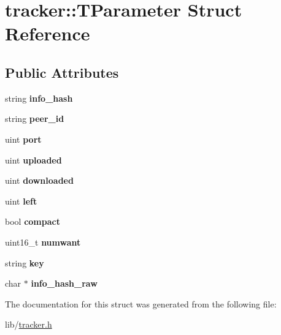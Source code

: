 \hypertarget{structtracker_1_1TParameter}{}\section{tracker\+:\+:T\+Parameter Struct Reference}
\label{structtracker_1_1TParameter}
\subsection*{Public Attributes}
\begin{DoxyCompactItemize}
\item 
\mbox{\label{structtracker_1_1TParameter_aefb0050bfd99eb6a30b547b3e8891dcd}} 
string {\bfseries info\+\_\+hash}
\item 
\mbox{\label{structtracker_1_1TParameter_aa4fecf8ffb04fac7e3929cef30f032ac}} 
string {\bfseries peer\+\_\+id}
\item 
\mbox{\label{structtracker_1_1TParameter_a37c80391b4706f15068938a5186ebcb5}} 
uint {\bfseries port}
\item 
\mbox{\label{structtracker_1_1TParameter_aca491cdfef7ea15eb10768389dd8d043}} 
uint {\bfseries uploaded}
\item 
\mbox{\label{structtracker_1_1TParameter_a4e7ad869a2a84c1773fa97e2f8ac7a70}} 
uint {\bfseries downloaded}
\item 
\mbox{\label{structtracker_1_1TParameter_ac4cfc3ad1c6e7cf4301d1940723e331a}} 
uint {\bfseries left}
\item 
\mbox{\label{structtracker_1_1TParameter_aa20b3bfd0be9058a717e277e917a1604}} 
bool {\bfseries compact}
\item 
\mbox{\label{structtracker_1_1TParameter_a21bb71f791e005b04f27d2d1ea1b7907}} 
uint16\+\_\+t {\bfseries numwant}
\item 
\mbox{\label{structtracker_1_1TParameter_a54bbbc985f11ea3d022d24e2dd9d8a92}} 
string {\bfseries key}
\item 
\mbox{\label{structtracker_1_1TParameter_ae88632924fe55b815994a2dc2bce67a2}} 
char $\ast$ {\bfseries info\+\_\+hash\+\_\+raw}
\end{DoxyCompactItemize}


The documentation for this struct was generated from the following file\+:\begin{DoxyCompactItemize}
\item 
lib/\hyperlink{tracker_8h}{tracker.\+h}\end{DoxyCompactItemize}
